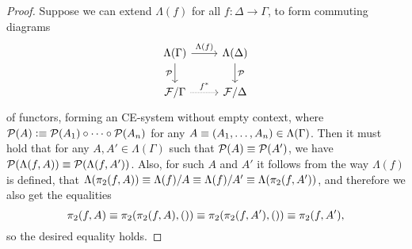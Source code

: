 \begin{proof}
Suppose we can extend $\Lambda(f)$ for all $f:\Delta\to\Gamma$, to form commuting
diagrams
\begin{equation*}
\begin{tikzcd}
\Lambda(\Gamma) \arrow[d,swap,"\mathcal{P}"] \arrow[r,"\Lambda(f)"] & \Lambda(\Delta) \arrow[d,"\mathcal{P}"] \\
\cat{F}/\Gamma \arrow[r,densely dotted,"{f^\ast}"] & \cat{F}/\Delta
\end{tikzcd}
\end{equation*}
of functors, forming an CE-system without empty context, where $\mathcal{P}(A)
\vcentcolon\equiv \mathcal{P}(A_1)\circ\cdots\circ\mathcal{P}(A_n)$ for any
$A\equiv (A_1,\ldots,A_n)\in\Lambda(\Gamma)$. Then it must hold that for any
$A,A'\in\Lambda(\Gamma)$ such that $\mathcal{P}(A)\equiv\mathcal{P}(A')$, we have
$\mathcal{P}(\Lambda(f,A))\equiv\mathcal{P}(\Lambda(f,A'))$. Also, for such
$A$ and $A'$ it follows from the way $\Lambda(f)$ is defined, 
that $\Lambda(\pi_2(f,A))\equiv \Lambda(f)/A\equiv
\Lambda(f)/A' \equiv \Lambda(\pi_2(f,A'))$, and therefore we also get the equalities
\begin{equation*}
\pi_2(f,A)\equiv \pi_2(\pi_2(f,A),())\equiv \pi_2(\pi_2(f,A'),()) \equiv \pi_2(f,A'),
\end{equation*}
so the desired equality holds.


\end{proof}
